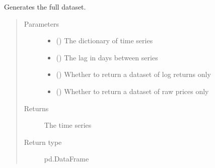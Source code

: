 \documentclass[letterpaper,10pt,english]{sphinxmanual}
\begin{document}
\begin{fulllineitems}
\label{\detokenize{index:Forecaster.preprocessing.generate_dataset}}
Generates the full dataset.
\begin{quote}\begin{description}
\item[{Parameters}] \leavevmode\begin{itemize}
\item {} 
 () \textendash{} The dictionary of time series

\item {} 
 () \textendash{} The lag in days between series

\item {} 
 () \textendash{} Whether to return a dataset of log returns only

\item {} 
 () \textendash{} Whether to return a dataset of raw prices only

\end{itemize}

\item[{Returns}] \leavevmode
The time series

\item[{Return type}] \leavevmode
pd.DataFrame

\end{description}\end{quote}

\end{fulllineitems}

\end{document}
